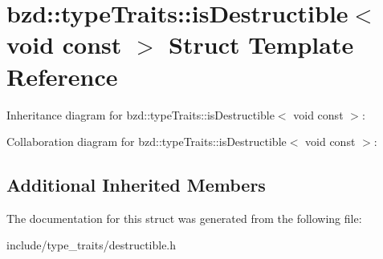 \hypertarget{structbzd_1_1typeTraits_1_1isDestructible_3_01void_01const_01_4}{}\section{bzd\+:\+:type\+Traits\+:\+:is\+Destructible$<$ void const $>$ Struct Template Reference}
\label{structbzd_1_1typeTraits_1_1isDestructible_3_01void_01const_01_4}


Inheritance diagram for bzd\+:\+:type\+Traits\+:\+:is\+Destructible$<$ void const $>$\+:


Collaboration diagram for bzd\+:\+:type\+Traits\+:\+:is\+Destructible$<$ void const $>$\+:
\subsection*{Additional Inherited Members}


The documentation for this struct was generated from the following file\+:\begin{DoxyCompactItemize}
\item 
include/type\+\_\+traits/destructible.\+h\end{DoxyCompactItemize}
